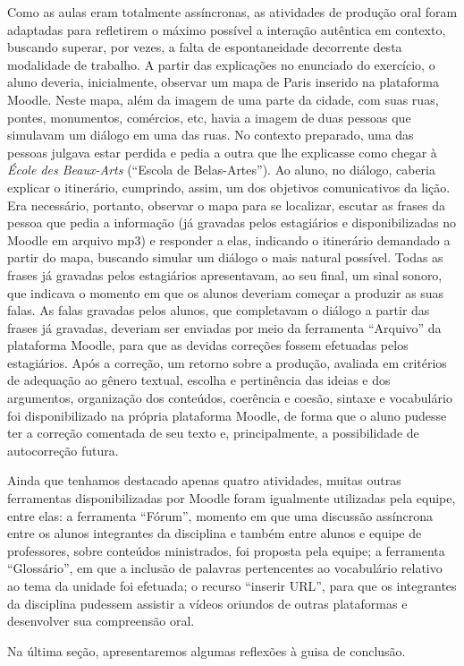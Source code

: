 Como as aulas eram totalmente assíncronas, as atividades de produção
oral foram adaptadas para refletirem o máximo possível a interação
autêntica em contexto, buscando superar, por vezes, a falta de
espontaneidade decorrente desta modalidade de trabalho. A partir das
explicações no enunciado do exercício, o aluno deveria, inicialmente,
observar um mapa de Paris inserido na plataforma Moodle. Neste mapa,
além da imagem de uma parte da cidade, com suas ruas, pontes,
monumentos, comércios, etc, havia a imagem de duas pessoas que simulavam
um diálogo em uma das ruas. No contexto preparado, uma das pessoas
julgava estar perdida e pedia a outra que lhe explicasse como chegar à
\emph{École des Beaux-Arts} (\enquote{Escola de Belas-Artes}). Ao aluno, no
diálogo, caberia explicar o itinerário, cumprindo, assim, um dos
objetivos comunicativos da lição. Era necessário, portanto, observar o
mapa para se localizar, escutar as frases da pessoa que pedia a
informação (já gravadas pelos estagiários e disponibilizadas no Moodle
em arquivo mp3) e responder a elas, indicando o itinerário demandado a
partir do mapa, buscando simular um diálogo o mais natural possível.
Todas as frases já gravadas pelos estagiários apresentavam, ao seu
final, um sinal sonoro, que indicava o momento em que os alunos deveriam
começar a produzir as suas falas. As falas gravadas pelos alunos, que
completavam o diálogo a partir das frases já gravadas, deveriam ser
enviadas por meio da ferramenta \enquote{Arquivo} da plataforma Moodle, para
que as devidas correções fossem efetuadas pelos estagiários. Após a
correção, um retorno sobre a produção, avaliada em critérios de
adequação ao gênero textual, escolha e pertinência das ideias e dos
argumentos, organização dos conteúdos, coerência e coesão, sintaxe e
vocabulário foi disponibilizado na própria plataforma Moodle, de forma
que o aluno pudesse ter a correção comentada de seu texto e,
principalmente, a possibilidade de autocorreção futura.

Ainda que tenhamos destacado apenas quatro atividades, muitas outras
ferramentas disponibilizadas por Moodle foram igualmente utilizadas pela
equipe, entre elas: a ferramenta \enquote{Fórum}, momento em que uma discussão
assíncrona entre os alunos integrantes da disciplina e também entre
alunos e equipe de professores, sobre conteúdos ministrados, foi
proposta pela equipe; a ferramenta \enquote{Glossário}, em que a inclusão de
palavras pertencentes ao vocabulário relativo ao tema da unidade foi
efetuada; o recurso \enquote{inserir URL}, para que os integrantes da
disciplina pudessem assistir a vídeos oriundos de outras plataformas e
desenvolver sua compreensão oral.

Na última seção, apresentaremos algumas reflexões à guisa de conclusão.
